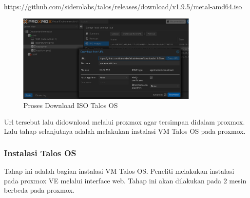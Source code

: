 \url{https://github.com/siderolabs/talos/releases/download/v1.9.5/metal-amd64.iso}

\begin{figure}[H]
    \centering
    \includegraphics[width=0.8\textwidth]{figures/talos-install-1.jpg}
    \caption{Proses Download ISO Talos OS}
    \label{fig:talos_download}
\end{figure}

Url tersebut lalu didownload melalui proxmox agar tersimpan didalam proxmox. Lalu tahap selanjutnya adalah melakukan instalasi VM Talos OS pada proxmox.

\subsubsection{Instalasi Talos OS}
Tahap ini adalah bagian instalasi VM Talos OS. Peneliti melakukan instalasi pada proxmox VE melalui interface web.
Tahap ini akan dilakukan pada 2 mesin berbeda pada proxmox.

